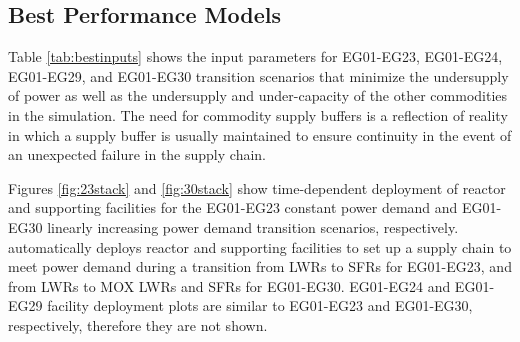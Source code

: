 \subsection{Best Performance Models}
Table \ref{tab:bestinputs} shows the \deploy input parameters for
EG01-EG23, EG01-EG24, EG01-EG29, and EG01-EG30 transition scenarios
that minimize the undersupply of power as well as the
undersupply and under-capacity of the other commodities
in the simulation. 
The need for commodity supply buffers is a reflection of reality
in which a supply buffer is usually maintained to ensure 
continuity in the event of an unexpected failure in the supply chain.

Figures \ref{fig:23stack} and \ref{fig:30stack} show
time-dependent deployment of reactor and supporting facilities for 
the EG01-EG23 constant power demand and EG01-EG30 linearly increasing power demand 
transition scenarios, respectively. 
\deploy automatically deploys reactor and supporting facilities 
to set up a supply chain to meet power demand
during a transition from \glspl{LWR} to \glspl{SFR} for EG01-EG23, 
and from \glspl{LWR} to \gls{MOX} \glspl{LWR} and \glspl{SFR} for 
EG01-EG30. 
EG01-EG24 and EG01-EG29 facility deployment plots are similar to 
EG01-EG23 and EG01-EG30, respectively, therefore they are not shown. 

